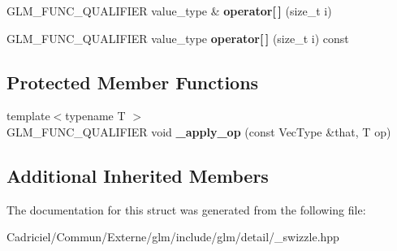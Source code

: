 \begin{DoxyCompactItemize}
\item 
G\+L\+M\+\_\+\+F\+U\+N\+C\+\_\+\+Q\+U\+A\+L\+I\+F\+I\+ER value\+\_\+type \& {\bfseries operator\mbox{[}$\,$\mbox{]}} (size\+\_\+t i)\hypertarget{structglm_1_1detail_1_1__swizzle__base2_aa3f2ab8e3e1a5c414b3fdca4cf75b706}{}\label{structglm_1_1detail_1_1__swizzle__base2_aa3f2ab8e3e1a5c414b3fdca4cf75b706}

\item 
G\+L\+M\+\_\+\+F\+U\+N\+C\+\_\+\+Q\+U\+A\+L\+I\+F\+I\+ER value\+\_\+type {\bfseries operator\mbox{[}$\,$\mbox{]}} (size\+\_\+t i) const \hypertarget{structglm_1_1detail_1_1__swizzle__base2_a1bec6727adac01b6bc3e1ccba935167e}{}\label{structglm_1_1detail_1_1__swizzle__base2_a1bec6727adac01b6bc3e1ccba935167e}

\end{DoxyCompactItemize}
\subsection*{Protected Member Functions}
\begin{DoxyCompactItemize}
\item 
{\footnotesize template$<$typename T $>$ }\\G\+L\+M\+\_\+\+F\+U\+N\+C\+\_\+\+Q\+U\+A\+L\+I\+F\+I\+ER void {\bfseries \+\_\+apply\+\_\+op} (const Vec\+Type \&that, T op)\hypertarget{structglm_1_1detail_1_1__swizzle__base2_a11d049274a60ecf4aac8cebc4c4e9be5}{}\label{structglm_1_1detail_1_1__swizzle__base2_a11d049274a60ecf4aac8cebc4c4e9be5}

\end{DoxyCompactItemize}
\subsection*{Additional Inherited Members}


The documentation for this struct was generated from the following file\+:\begin{DoxyCompactItemize}
\item 
Cadriciel/\+Commun/\+Externe/glm/include/glm/detail/\+\_\+swizzle.\+hpp\end{DoxyCompactItemize}
